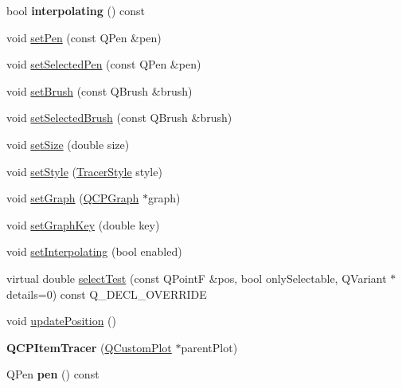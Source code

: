 \begin{DoxyCompactItemize}
\item 
bool {\bfseries interpolating} () const \hypertarget{class_q_c_p_item_tracer_ab318c233fa35c17a317af38ce7b3c312}{}\label{class_q_c_p_item_tracer_ab318c233fa35c17a317af38ce7b3c312}

\item 
void \hyperlink{class_q_c_p_item_tracer_af8048636fc1ef0152e51809b008df2ca}{set\+Pen} (const Q\+Pen \&pen)
\item 
void \hyperlink{class_q_c_p_item_tracer_ae1bf70db7f13f928660168cd3e5069f3}{set\+Selected\+Pen} (const Q\+Pen \&pen)
\item 
void \hyperlink{class_q_c_p_item_tracer_a2c303f7470a30084daa201ed556b3c36}{set\+Brush} (const Q\+Brush \&brush)
\item 
void \hyperlink{class_q_c_p_item_tracer_a0f55c084980a7a312af859d3e7b558ef}{set\+Selected\+Brush} (const Q\+Brush \&brush)
\item 
void \hyperlink{class_q_c_p_item_tracer_ae47fe0617f5fef5fdb766999569be10a}{set\+Size} (double size)
\item 
void \hyperlink{class_q_c_p_item_tracer_a41a2ac4f1acd7897b4e2a2579c03204e}{set\+Style} (\hyperlink{class_q_c_p_item_tracer_a2f05ddb13978036f902ca3ab47076500}{Tracer\+Style} style)
\item 
void \hyperlink{class_q_c_p_item_tracer_af5886f4ded8dd68cb4f3388f390790c0}{set\+Graph} (\hyperlink{class_q_c_p_graph}{Q\+C\+P\+Graph} $\ast$graph)
\item 
void \hyperlink{class_q_c_p_item_tracer_a6840143b42f3b685cedf7c6d83a704c8}{set\+Graph\+Key} (double key)
\item 
void \hyperlink{class_q_c_p_item_tracer_a6c244a9d1175bef12b50afafd4f5fcd2}{set\+Interpolating} (bool enabled)
\item 
virtual double \hyperlink{class_q_c_p_item_tracer_a9fd955fea40e977d66f3a9fd5765aec4}{select\+Test} (const Q\+PointF \&pos, bool only\+Selectable, Q\+Variant $\ast$details=0) const Q\+\_\+\+D\+E\+C\+L\+\_\+\+O\+V\+E\+R\+R\+I\+DE
\item 
void \hyperlink{class_q_c_p_item_tracer_a5b90296109e36384aedbc8908a670413}{update\+Position} ()
\item 
{\bfseries Q\+C\+P\+Item\+Tracer} (\hyperlink{class_q_custom_plot}{Q\+Custom\+Plot} $\ast$parent\+Plot)\hypertarget{class_q_c_p_item_tracer_adc5ca846eeac323db4aa1fc4081e36be}{}\label{class_q_c_p_item_tracer_adc5ca846eeac323db4aa1fc4081e36be}

\item 
Q\+Pen {\bfseries pen} () const \hypertarget{class_q_c_p_item_tracer_a1f51b61e98c276298a0874d5e89707f0}{}\label{class_q_c_p_item_tracer_a1f51b61e98c276298a0874d5e89707f0}


\end{DoxyCompactItemize}
